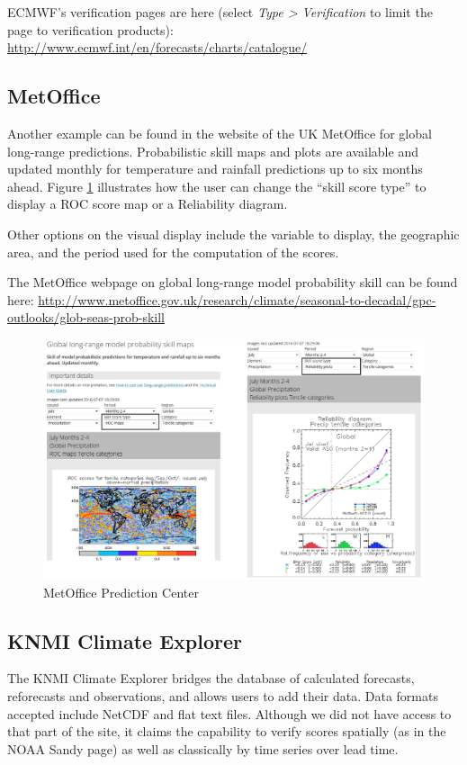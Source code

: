 \documentclass[logos,parttoc,morelanguage=french,morelanguage=german,draft]{orsay-memoire}
\begin{document}
ECMWF's verification pages are here (select \emph{Type > Verification} to limit the page to verification products): \href{http://www.ecmwf.int/en/forecasts/charts/catalogue/}{http://www.ecmwf.int/en/forecasts/charts/catalogue/}



\subsection*{MetOffice}
Another example can be found in the website of the UK MetOffice for global long-range predictions. Probabilistic skill maps and plots are available and updated monthly for temperature and rainfall predictions up to six months ahead. Figure \ref{fig:metOffice1} illustrates how the user can change the “skill score type” to display a ROC score map or a Reliability diagram.

Other options on the visual display include the variable to display, the geographic area, and the period used for the computation of the scores.

The MetOffice webpage on global long-range model probability skill can be found here: \href{http://www.metoffice.gov.uk/research/climate/seasonal-to-decadal/gpc-outlooks/glob-seas-prob-skill}{http://www.metoffice.gov.uk/research/climate/seasonal-to-decadal/gpc-outlooks/glob-seas-prob-skill}

\begin{figure}[H]
\centering
\includegraphics[width=0.80\linewidth]{images/exempleMetOffice1.png}
  \caption{MetOffice Prediction Center}
  \label{fig:metOffice1}
\end{figure}


\subsection*{KNMI Climate Explorer}
The KNMI Climate Explorer bridges the database of calculated forecasts, reforecasts and observations, and allows users to add their data. Data formats accepted include NetCDF and flat text files. Although we did not have access to that part of the site, it claims the capability to verify scores spatially (as in the NOAA Sandy page) as well as classically by time series over lead time.
\end{document}
